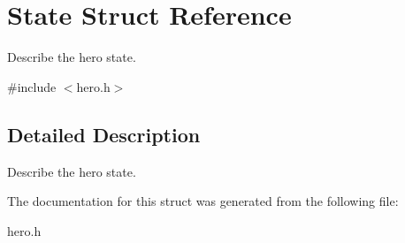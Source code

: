 \hypertarget{structState}{}\section{State Struct Reference}
\label{structState}


Describe the hero state.  




{\ttfamily \#include $<$hero.\+h$>$}



\subsection{Detailed Description}
Describe the hero state. 

The documentation for this struct was generated from the following file\+:\begin{DoxyCompactItemize}
\item 
hero.\+h\end{DoxyCompactItemize}
